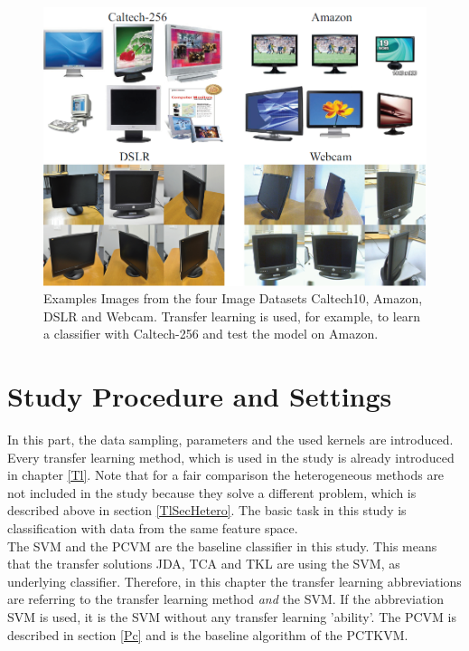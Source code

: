 \begin{figure}[]
	\centering
	\includegraphics[width=.8\linewidth]{figures/ExampleImages.png}
	\caption[Examples from Image Dataset]{Examples Images from the four Image Datasets Caltech10, Amazon, DSLR and Webcam. Transfer learning is used, for example, to learn a classifier with Caltech-256 and test the model on Amazon.\cite{Gong.}}
	\label{FigExampleImages}
\end{figure}
\section{Study Procedure and Settings}\label{EmSecStudy}
In this part, the data sampling, parameters and the used kernels are introduced.
Every transfer learning method, which is used in the study is already introduced in chapter \ref{Tl}.
Note that for a fair comparison the heterogeneous methods are not included in the study because they solve a different problem, which is described above in section \ref{TlSecHetero}.
The basic task in this study is classification with data from the same feature space.\\
The \ac{SVM} and the \acl{PCVM} are the baseline classifier in this study.
This means that the transfer solutions \acs{JDA}, \acs{TCA} and \acs{TKL} are using the \acs{SVM}, as underlying classifier. 
Therefore, in this chapter the transfer learning abbreviations are referring to the transfer learning method \textit{and} the \acs{SVM}.
If the abbreviation \acs{SVM} is used, it is the \acs{SVM} without any transfer learning 'ability'.
The \acs{PCVM} is described in section \ref{Pc} and is the baseline algorithm of the \acs{PCTKVM}.\\

